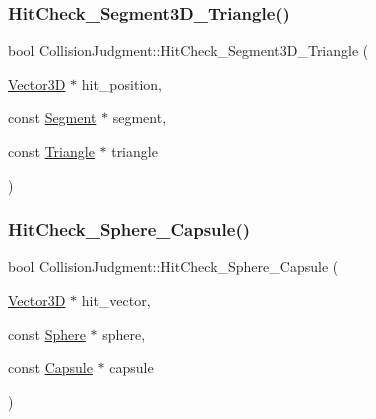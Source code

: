 \mbox{\label{class_collision_judgment_a4f5344d6ac14db5d3732db47050bd549}} 
\subsubsection{\texorpdfstring{Hit\+Check\+\_\+\+Segment3\+D\+\_\+\+Triangle()}{HitCheck\_Segment3D\_Triangle()}}
{\footnotesize\ttfamily bool Collision\+Judgment\+::\+Hit\+Check\+\_\+\+Segment3\+D\+\_\+\+Triangle (\begin{DoxyParamCaption}\item[{\mbox{\hyperlink{class_vector3_d}{Vector3D}} $\ast$}]{hit\+\_\+position,  }\item[{const \mbox{\hyperlink{class_segment}{Segment}} $\ast$}]{segment,  }\item[{const \mbox{\hyperlink{class_triangle}{Triangle}} $\ast$}]{triangle }\end{DoxyParamCaption})\hspace{0.3cm}{\ttfamily [static]}}

\mbox{\label{class_collision_judgment_a4cc335999fcbeadf0aa1b6ebcb749e5b}} 
\subsubsection{\texorpdfstring{Hit\+Check\+\_\+\+Sphere\+\_\+\+Capsule()}{HitCheck\_Sphere\_Capsule()}}
{\footnotesize\ttfamily bool Collision\+Judgment\+::\+Hit\+Check\+\_\+\+Sphere\+\_\+\+Capsule (\begin{DoxyParamCaption}\item[{\mbox{\hyperlink{class_vector3_d}{Vector3D}} $\ast$}]{hit\+\_\+vector,  }\item[{const \mbox{\hyperlink{class_sphere}{Sphere}} $\ast$}]{sphere,  }\item[{const \mbox{\hyperlink{class_capsule}{Capsule}} $\ast$}]{capsule }\end{DoxyParamCaption})\hspace{0.3cm}{\ttfamily [static]}}

